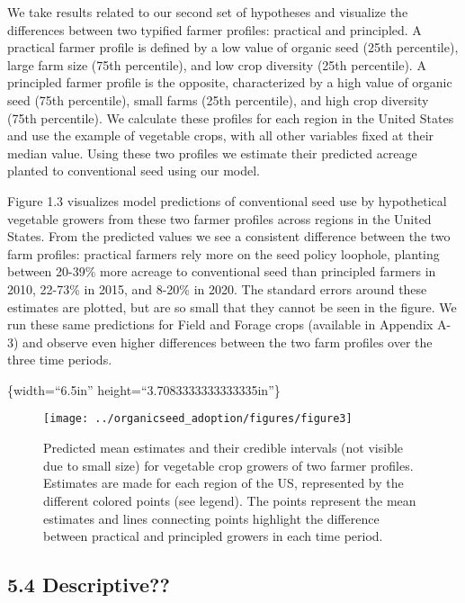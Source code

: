 \documentclass[twoside,12pt,final]{ucthesis-CA2012}
\begin{document}
\begin{ucmainmatter}
We take results related to our second set of hypotheses and visualize
the differences between two typified farmer profiles: practical and
principled. A practical farmer profile is defined by a low value of
organic seed (25th percentile), large farm size (75th percentile), and
low crop diversity (25th percentile). A principled farmer profile is the
opposite, characterized by a high value of organic seed (75th
percentile), small farms (25th percentile), and high crop diversity
(75th percentile). We calculate these profiles for each region in the
United States and use the example of vegetable crops, with all other
variables fixed at their median value. Using these two profiles we
estimate their predicted acreage planted to conventional seed using our
model.

Figure 1.3 visualizes model predictions of conventional seed use by
hypothetical vegetable growers from these two farmer profiles across
regions in the United States. From the predicted values we see a
consistent difference between the two farm profiles: practical farmers
rely more on the seed policy loophole, planting between 20-39\% more
acreage to conventional seed than principled farmers in 2010, 22-73\% in
2015, and 8-20\% in 2020. The standard errors around these estimates are
plotted, but are so small that they cannot be seen in the figure. We run
these same predictions for Field and Forage crops (available in Appendix
A-3) and observe even higher differences between the two farm profiles
over the three time periods.

\{width=``6.5in'' height=``3.7083333333333335in''\}
\begin{figure}

{\centering \texttt{[image: ../organicseed\_adoption/figures/figure3]} 

}

\caption{Predicted mean estimates and their credible intervals (not visible due to small size) for vegetable crop growers of two farmer profiles. Estimates are made for each region of the US, represented by the different colored points (see legend). The points represent the mean estimates and lines connecting points highlight the difference between practical and principled growers in each time period.}\label{fig:unnamed-chunk-13}
\end{figure}
\hypertarget{descriptive}{%
\subsection{5.4 Descriptive??}\label{descriptive}}


\end{ucmainmatter}
\end{document}
